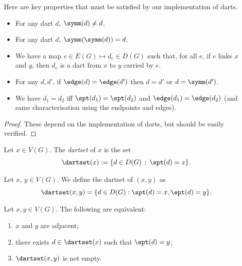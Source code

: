 Here are key properties that must be satisfied by our implementation of darts.

\begin{lemma}
  \label{lem:dart_API}
  \leanok
  \begin{itemize}
    \item For any dart $d$, $\symm(d) \neq d$.
    \item For any dart $d$, $\symm(\symm(d)) = d$.
    \item We have a map $e \in E(G) \mapsto d_e \in D(G)$ such that, for all $e$,
    if $e$ links $x$ and $y$, then $d_e$ is a dart from $x$ to $y$ carried by $e$.
    \item For any $d, d'$, if $\edge(d)=\edge(d')$ then $d=d'$ or $d=\symm(d')$.
    \item We have $d_1 = d_2$ iff $\spt(d_1) = \spt(d_2)$ and $\edge(d_1) = \edge(d_2)$
    (and same characterisation using the endpoints and edges).
  \end{itemize}
\end{lemma}

\begin{proof}
  \leanok
  These depend on the implementation of darts, but should be easily verified.
\end{proof}

\begin{definition}
  \label{def:dartset}
  \leanok
  Let $x \in V(G)$. The \emph{dartset} of $x$ is the set
  \begin{equation}
    \dartset(x) := \{ d \in D(G) \, : \, \spt(d)=x\}.
  \end{equation}
\end{definition}

\begin{definition}
  \label{def:dartset_pair}
  Let $x$, $y \in V(G)$.
  We define the dartset of $(x,y)$ as
  \begin{equation*}
    \dartset(x,y)
    = \{ d \in D(G) : \spt(d) = x, \ept(d) = y\}.
  \end{equation*}
\end{definition}

\begin{lemma}
  \label{lem:adjacent_vs_dart}
  \leanok
  Let $x, y \in V(G)$.
  The following are equivalent:
  \begin{enumerate}
    \item $x$ and $y$ are adjacent;
    \item there exists $d \in \dartset(x)$ such that $\ept(d)=y$;
    \item $\dartset(x,y)$ is not empty.
  \end{enumerate}
\end{lemma}

